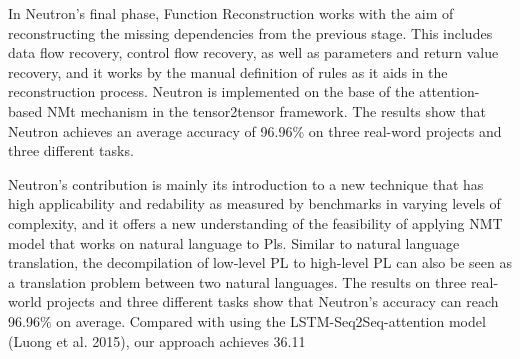 \documentclass{article}
\begin{document}
In Neutron’s final phase, Function Reconstruction works with the aim of reconstructing the missing dependencies from the previous stage. This includes data flow recovery, control flow recovery, as well as parameters and return value recovery, and it works by the manual definition of rules as it aids in the reconstruction process. Neutron is implemented on the base of the attention-based NMt mechanism in the tensor2tensor framework. The results show that Neutron achieves an average accuracy of 96.96\% on three real-word projects and three different tasks.

Neutron’s contribution is mainly its introduction to a new technique that has high applicability and redability as measured by benchmarks in varying levels of complexity, and it offers a new understanding of the feasibility of applying NMT model that works on natural language to Pls. Similar to natural language translation, the decompilation of low-level PL to high-level PL can also be seen as a translation problem between two natural languages. The results on three real-world projects and three different tasks show that Neutron’s accuracy can reach 96.96\% on average. Compared with using the LSTM-Seq2Seq-attention model (Luong et al. 2015), our approach achieves 36.11%
\end{document}
